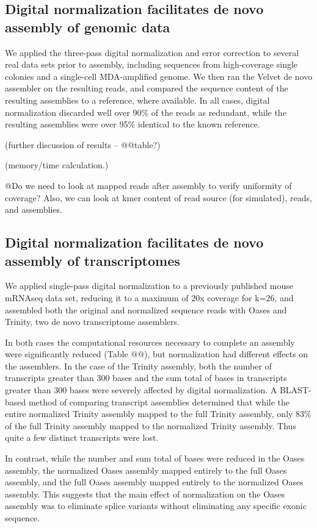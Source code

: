 \documentclass[10pt,draft]{article}
\begin{document}
\subsection*{Digital normalization facilitates de novo assembly of genomic data}

We applied the three-pass digital normalization and error correction
to several real data sets prior to assembly, including sequences from
high-coverage single colonies and a single-cell MDA-amplified genome.
We then ran the Velvet de novo assembler on the resulting reads, and
compared the sequence content of the resulting assemblies to a
reference, where available.  In all cases, digital normalization
discarded well over 90\% of the reads as redundant, while the
resulting assemblies were over 95\% identical to the known reference.

(further discussion of results -- @@table?)

(memory/time calculation.)

@Do we need to look at mapped reads after assembly to verify uniformity
of coverage? Also, we can look at kmer content of read source (for
simulated), reads, and assemblies.

\subsection*{Digital normalization facilitates de novo assembly of transcriptomes}

We applied single-pass digital normalization to a previously published
mouse mRNAseq data set, reducing it to a maximum of 20x coverage for
k=26, and assembled both the original and normalized sequence reads
with Oases and Trinity, two de novo transcriptome assemblers.

In both cases the computational resources necessary to complete an
assembly were significantly reduced (Table @@), but normalization had different
effects on the assemblers.  In the case of the Trinity
assembly, both the number of transcripts greater than 300 bases and
the sum total of bases in transcripts greater than 300 bases were
severely affected by digital normalization.  A BLAST-based method of
comparing transcript assemblies determined that while the entire normalized
Trinity assembly mapped to the full Trinity assembly, only 83\% of the
full Trinity assembly mapped to the normalized Trinity assembly. Thus quite
a few distinct transcripts were lost.

In contrast, while the number and sum total of bases were reduced in
the Oases assembly, the normalized Oases assembly mapped entirely to the full
Oases assembly, and the full Oases assembly mapped entirely to the normalized
Oases assembly.  This suggests that the main effect of
normalization on the Oases assembly was to eliminate splice variants
without eliminating any specific exonic sequence.
\end{document}
